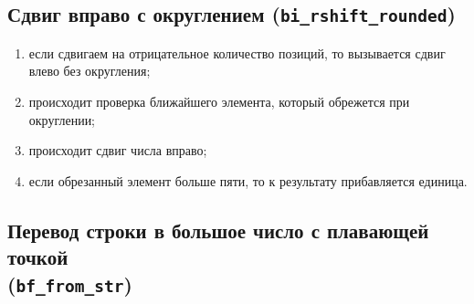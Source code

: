\documentclass[a4paper,12pt]{extarticle}
\begin{document}
\subsection{Сдвиг вправо с округлением (\texttt{bi\_rshift\_rounded})}
\begin{enumerate}
    \item если сдвигаем на отрицательное количество позиций, то вызывается сдвиг влево без округления;
    \item происходит проверка ближайшего элемента, который обрежется при округлении;
    \item происходит сдвиг числа вправо;
    \item если обрезанный элемент больше пяти, то к результату прибавляется единица.
\end{enumerate}

\subsection{Перевод строки в большое число с плавающей точкой \\ (\texttt{bf\_from\_str})}
\end{document}
